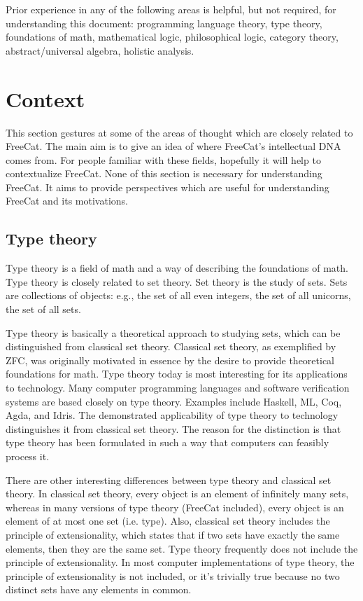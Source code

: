 \documentclass{article}
\begin{document}
Prior experience in any of the following areas is helpful, but not required, for understanding this document: programming language theory, type theory, foundations of math, mathematical logic, philosophical logic, category theory, abstract/universal algebra, holistic analysis.

\section{Context}

This section gestures at some of the areas of thought which are closely related to FreeCat. The main aim is to give an idea of where FreeCat's intellectual DNA comes from. For people familiar with these fields, hopefully it will help to contextualize FreeCat. None of this section is necessary for understanding FreeCat. It aims to provide perspectives which are useful for understanding FreeCat and its motivations.

\subsection{Type theory}

Type theory is a field of math and a way of describing the foundations of math. Type theory is closely related to set theory. Set theory is the study of sets. Sets are collections of objects: e.g., the set of all even integers, the set of all unicorns, the set of all sets.

Type theory is basically a theoretical approach to studying sets, which can be distinguished from classical set theory. Classical set theory, as exemplified by ZFC, was originally motivated in essence by the desire to provide theoretical foundations for math. Type theory today is most interesting for its applications to technology. Many computer programming languages and software verification systems are based closely on type theory. Examples include Haskell, ML, Coq, Agda, and Idris. The demonstrated applicability of type theory to technology distinguishes it from classical set theory. The reason for the distinction is that type theory has been formulated in such a way that computers can feasibly process it.

There are other interesting differences between type theory and classical set theory. In classical set theory, every object is an element of infinitely many sets, whereas in many versions of type theory (FreeCat included), every object is an element of at most one set (i.e. type). Also, classical set theory includes the principle of extensionality, which states that if two sets have exactly the same elements, then they are the same set. Type theory frequently does not include the principle of extensionality. In most computer implementations of type theory, the principle of extensionality is not included, or it's trivially true because no two distinct sets have any elements in common.
\end{document}
